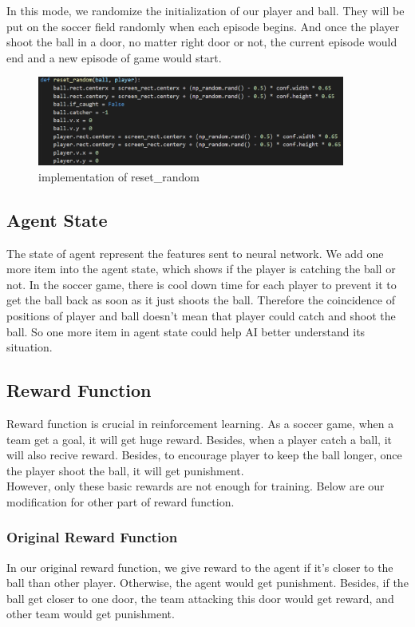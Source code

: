 \documentclass[12pt]{article}
\begin{document}
In this mode, we randomize the initialization of our player and ball. They will be put on the soccer field randomly when each episode begins. And once the player shoot the ball in a door, no matter right door or not, the current episode would end and a new episode of game would start.
\begin{figure}[H]
	\begin{center}
		\includegraphics[width=0.9\textwidth]{reset_random}
		\caption{implementation of reset\_random}
	\end{center}
\end{figure}


\subsection{Agent State}
The state of agent represent the features sent to neural network. We add one more item into the agent state, which shows if the player is catching the ball or not. In the soccer game, there is cool down time for each player to prevent it to get the ball back as soon as it just shoots the ball. Therefore the coincidence of positions of player and ball doesn't mean that player could catch and shoot the ball. So one more item in agent state could help AI better understand its situation.


\subsection{Reward Function}
Reward function is crucial in reinforcement learning. As a soccer game, when a team get a goal, it will get huge reward. Besides, when a player catch a ball, it will also recive reward. Besides, to encourage player to keep the ball longer, once the player shoot the ball, it will get punishment.\\
However, only these basic rewards are not enough for training. Below are our modification for other part of reward function.

\subsubsection{Original Reward Function}
 In our original reward function, we give reward to the agent if it's closer to the ball than other player. Otherwise, the agent would get punishment. Besides, if the ball get closer to one door, the team attacking this door would get reward, and other team would get punishment.
\end{document}

